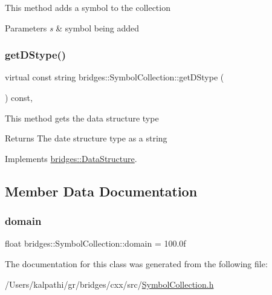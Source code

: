 This method adds a symbol to the collection


\begin{DoxyParams}{Parameters}
{\em s} & symbol being added \\
\hline
\end{DoxyParams}
\mbox{\label{classbridges_1_1_symbol_collection_a9bc5abacaf6f90b2d013963311c8052e}} 
\subsubsection{\texorpdfstring{getDStype()}{getDStype()}}
{\footnotesize\ttfamily virtual const string bridges\+::\+Symbol\+Collection\+::get\+D\+Stype (\begin{DoxyParamCaption}{ }\end{DoxyParamCaption}) const\hspace{0.3cm}{\ttfamily [inline]}, {\ttfamily [virtual]}}

This method gets the data structure type

\begin{DoxyReturn}{Returns}
The date structure type as a string 
\end{DoxyReturn}


Implements \mbox{\hyperlink{classbridges_1_1_data_structure_a957a63b106e340bc753620c650632bdc}{bridges\+::\+Data\+Structure}}.



\subsection{Member Data Documentation}
\mbox{\label{classbridges_1_1_symbol_collection_a9387df86c54863524ab4779ff8458c7a}} 
\subsubsection{\texorpdfstring{domain}{domain}}
{\footnotesize\ttfamily float bridges\+::\+Symbol\+Collection\+::domain = 100.\+0f\hspace{0.3cm}{\ttfamily [protected]}}



The documentation for this class was generated from the following file\+:\begin{DoxyCompactItemize}
\item 
/\+Users/kalpathi/gr/bridges/cxx/src/\mbox{\hyperlink{_symbol_collection_8h}{Symbol\+Collection.\+h}}\end{DoxyCompactItemize}

